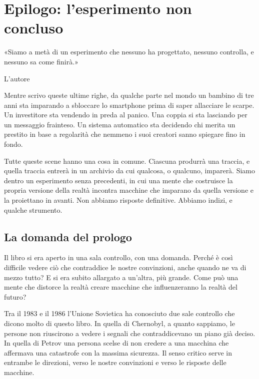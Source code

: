 \chapter{Epilogo: l'esperimento non concluso}
\label{cap:p4c26}

\epigraph{«Siamo a metà di un esperimento che nessuno ha progettato, nessuno controlla, e nessuno sa come finirà.»}{L'autore}

Mentre scrivo queste ultime righe, da qualche parte nel mondo un bambino di tre anni sta imparando a sbloccare lo smartphone prima di saper allacciare le scarpe. Un investitore sta vendendo in preda al panico. Una coppia si sta lasciando per un messaggio frainteso. Un sistema automatico sta decidendo chi merita un prestito in base a regolarità che nemmeno i suoi creatori sanno spiegare fino in fondo.

Tutte queste scene hanno una cosa in comune. Ciascuna produrrà una traccia, e quella traccia entrerà in un archivio da cui qualcosa, o qualcuno, imparerà. Siamo dentro un esperimento senza precedenti, in cui una mente che costruisce la propria versione della realtà incontra macchine che imparano da quella versione e la proiettano in avanti. Non abbiamo risposte definitive. Abbiamo indizi, e qualche strumento.

\section*{La domanda del prologo}

Il libro si era aperto in una sala controllo, con una domanda. Perché è così difficile vedere ciò che contraddice le nostre convinzioni, anche quando ne va di mezzo tutto? E si era subito allargato a un'altra, più grande. Come può una mente che distorce la realtà creare macchine che influenzeranno la realtà del futuro?

Tra il 1983 e il 1986 l'Unione Sovietica ha conosciuto due sale controllo che dicono molto di questo libro. In quella di Chernobyl, a quanto sappiamo, le persone non riuscirono a vedere i segnali che contraddicevano un piano già deciso. In quella di Petrov una persona scelse di non credere a una macchina che affermava una catastrofe con la massima sicurezza. Il senso critico serve in entrambe le direzioni, verso le nostre convinzioni e verso le risposte delle macchine.


